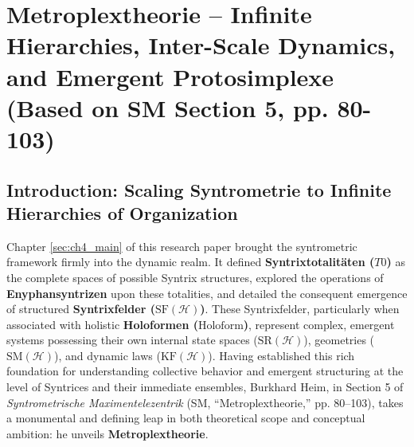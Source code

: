 \documentclass[
    12pt,              %
    a4paper,           %
    headings=normal,   %
    twoside=true,      %
    BCOR=8mm,          %
]{scrbook}
\newcommand{\q}[1]{\enquote{#1}}
\newcommand{\syntrixtotalitaet}{T0}
\newcommand{\holoform}{\text{Holoform}}
\begin{document}
\chapter{Metroplextheorie – Infinite Hierarchies, Inter-Scale Dynamics, and Emergent Protosimplexe (Based on SM Section 5, pp. 80-103)}
\label{sec:ch5_main}

\section{Introduction: Scaling Syntrometrie to Infinite Hierarchies of Organization}
\label{sec:ch5_intro}

Chapter \ref{sec:ch4_main} of this research paper brought the syntrometric framework firmly into the dynamic realm. It defined \textbf{Syntrixtotalitäten (\(\syntrixtotalitaet\))} as the complete spaces of possible Syntrix structures, explored the operations of \textbf{Enyphansyntrizen} upon these totalities, and detailed the consequent emergence of structured \textbf{Syntrixfelder (\(\text{SF}(\mathcal{H})\))}. These Syntrixfelder, particularly when associated with holistic \textbf{Holoformen (\(\holoform\))}, represent complex, emergent systems possessing their own internal state spaces (\(\text{SR}(\mathcal{H})\)), geometries (\(\text{SM}(\mathcal{H})\)), and dynamic laws (\(\text{KF}(\mathcal{H})\)). Having established this rich foundation for understanding collective behavior and emergent structuring at the level of Syntrices and their immediate ensembles, Burkhard Heim, in Section 5 of \textit{Syntrometrische Maximentelezentrik} (SM, \q{Metroplextheorie,} pp. 80–103), takes a monumental and defining leap in both theoretical scope and conceptual ambition: he unveils \textbf{Metroplextheorie}.
\end{document}

